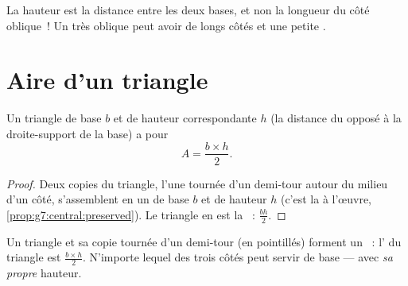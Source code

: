 \begin{remark}
La hauteur est la distance \emph{} entre les deux
bases, et non la longueur du côté oblique~! Un  très
oblique peut avoir de longs côtés et une petite .
\end{remark}

\section{Aire d'un triangle}

\begin{theorem}[Triangle]\label{thm:g7:areas:triangle}
Un triangle de base $b$ et de hauteur correspondante $h$ (la distance
 du  opposé à la droite-support de la base) a
pour 
\[
A = \frac{b \times h}{2} .
\]
\end{theorem}

\begin{proof}
Deux copies du triangle, l'une tournée d'un demi-tour autour du
milieu d'un côté, s'assemblent en un  de base $b$ et de
hauteur $h$ (c'est la  à l'œuvre,
\cref{prop:g7:central:preserved}). Le triangle en est la ~:
$\frac{bh}{2}$.
\end{proof}

\begin{omfigure}

{\small Un triangle et sa copie tournée d'un demi-tour (en pointillés)
forment un ~: l' du triangle est
$\frac{b\times h}{2}$. N'importe lequel des trois côtés peut servir
de base --- avec \emph{sa propre} hauteur.}
\end{omfigure}


